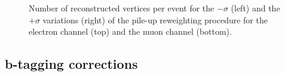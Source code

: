 \begin{figure}[!htpb]
\begin{center}
	\caption{\label{fig:pileup_vertices_variations}
    Number of reconstructed vertices per event for the $-\sigma$ (left) and the $+\sigma$ variations (right) of
    the pile-up reweighting procedure for the electron channel (top) and the muon channel (bottom).}
\end{center}
\end{figure}




\subsection{b-tagging corrections}
\label{ss_xsection:btagging_corrections}

